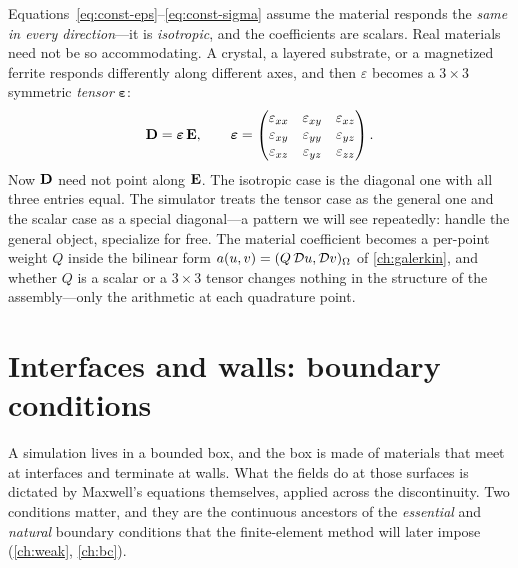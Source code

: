Equations~\eqref{eq:const-eps}--\eqref{eq:const-sigma} assume the material
responds the \emph{same in every direction}---it is \emph{isotropic}, and the
coefficients are scalars. Real materials need not be so accommodating. A
crystal, a layered substrate, or a magnetized ferrite responds differently
along different axes, and then $\varepsilon$ becomes a $3\times3$ symmetric
\emph{tensor} $\bm{\varepsilon}$:
\[
  \mathbf{D} = \bm{\varepsilon}\,\mathbf{E},
  \qquad
  \bm{\varepsilon} =
  \begin{pmatrix}
    \varepsilon_{xx} & \varepsilon_{xy} & \varepsilon_{xz}\\
    \varepsilon_{xy} & \varepsilon_{yy} & \varepsilon_{yz}\\
    \varepsilon_{xz} & \varepsilon_{yz} & \varepsilon_{zz}
  \end{pmatrix}.
\]
Now $\mathbf{D}$ need not point along $\mathbf{E}$. The isotropic case is the diagonal one
with all three entries equal. The simulator treats the tensor case as the
general one and the scalar case as a special diagonal---a pattern we will see
repeatedly: handle the general object, specialize for free. The material
coefficient becomes a per-point weight $Q$ inside the bilinear form
$a(u,v)=(Q\,\mathcal{D} u,\mathcal{D} v)_\Omega$ of \cref{ch:galerkin}, and whether $Q$
is a scalar or a $3\times3$ tensor changes nothing in the structure of the
assembly---only the arithmetic at each quadrature point.

\section{Interfaces and walls: boundary conditions}
\label{sec:bc}

A simulation lives in a bounded box, and the box is made of materials that
meet at interfaces and terminate at walls. What the fields do at those
surfaces is dictated by Maxwell's equations themselves, applied across the
discontinuity. Two conditions matter, and they are the continuous ancestors of
the \emph{essential} and \emph{natural} boundary conditions that the
finite-element method will later impose (\cref{ch:weak}, \cref{ch:bc}).

